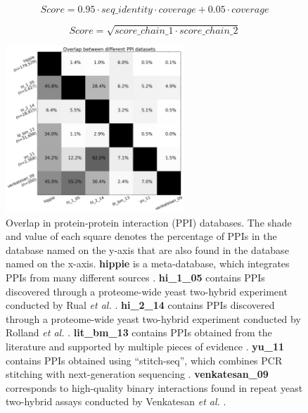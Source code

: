 \begin{equation} \label{eq:core_alignment_score}
	Score = 0.95 \cdot seq\_identity \cdot coverage + 0.05 \cdot coverage
\end{equation}

\begin{equation} \label{eq:interface_alignment_score}
	Score = \sqrt{score\_chain\_1 \cdot score\_chain\_2}
\end{equation}



\begin{figure}[!tb]
	\centering
	\includegraphics[width=0.6\textwidth]{static/profs/ppi_database_overlap.png}
	\caption[Overlap in protein-protein interaction databases.]{Overlap in protein-protein interaction (PPI) databases. The shade and value of each square denotes the percentage of PPIs in the database named on the y-axis that are also found in the database named on the x-axis. \textbf{hippie} is a meta-database, which integrates PPIs from many different sources \cite{schaefer_hippie:_2012}. \textbf{hi\_1\_05} contains PPIs discovered through a proteome-wide yeast two-hybrid experiment conducted by Rual \textit{et al.} \cite{rual_towards_2005}. \textbf{hi\_2\_14} contains PPIs discovered through a proteome-wide yeast two-hybrid experiment conducted by Rolland \textit{et al.} \cite{rolland_proteome-scale_2014}. \textbf{lit\_bm\_13} contains PPIs obtained from the literature and supported by multiple pieces of evidence \cite{rolland_proteome-scale_2014}. \textbf{yu\_11} contains PPIs obtained using ``stitch-seq'', which combines PCR stitching with next-generation sequencing \cite{yu_next-generation_2011}. \textbf{venkatesan\_09} corresponds to high-quality binary interactions found in repeat yeast two-hybrid assays conducted by Venkatesan \textit{et al.} \cite{venkatesan_empirical_2009}.}
	\label{fig:ppi_database_overlap}
\end{figure}



